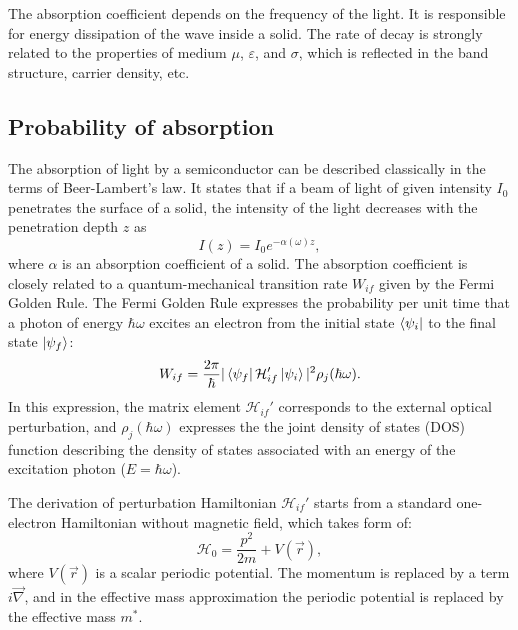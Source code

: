 \documentclass[titlepage,a4paper]{book}
\newcommand{\wciecie}{\quad\phantom{v}}
\begin{document}
The absorption coefficient depends on the frequency of the light. It is responsible for energy dissipation of the wave inside a solid. The rate of decay is strongly related to the properties of medium $\mu$, $\varepsilon$, and $\sigma$, which is reflected in the band structure, carrier density, etc.

\subsection{Probability of absorption}
\label{section:oscillator_strength}
\wciecie
The absorption of light by a semiconductor can be described classically in the terms of Beer-Lambert's law. It states that if a beam of light of given intensity $I_0$ penetrates the surface of a solid, the intensity of the light decreases with the penetration depth $z$ as
\begin{equation}
\label{eq:L-B_law}
I(z) = I_0 e^{-\alpha (\omega) z},
\end{equation}
where $\alpha$ is an absorption coefficient of a solid. The absorption coefficient is closely related to a quantum-mechanical transition rate $W_{if}$ given by the Fermi Golden Rule. The Fermi Golden Rule expresses the probability per unit time that a photon of energy $\hbar\omega$ excites an electron from the initial state $\bra{\psi_i}$ to the final state $\ket{\psi_f}$:
\begin{equation}
W_{if} = \frac{2\pi}{\hbar} |\bra{\psi_f}\mathcal{H}_{if}'\ket{\psi_i}|^2 \rho_j(\hbar\omega).
\label{eq:FermiGolderRule}
\end{equation}
In this expression, the matrix element $\mathcal{H}_{if}'$ corresponds to the external optical perturbation, and $\rho_j(\hbar\omega)$ expresses the the joint density of states (DOS) function describing the density of states associated with an energy of the excitation photon ($E = \hbar \omega$). 

The derivation of perturbation Hamiltonian $\mathcal{H}_{if}'$ starts from a standard one-electron Hamiltonian without magnetic field, which takes form of:
\begin{equation}
\label{eq:Perturbed_Hamiltonian}
\mathcal{H}_0 = \frac{p^2}{2m} + V(\vec{r}),
\end{equation}  
where $V(\vec{r})$ is a scalar periodic potential. The momentum is replaced by a term $i\vec{\nabla}$, and in the effective mass approximation the periodic potential is replaced by the effective mass $m^*$. 
\end{document}
